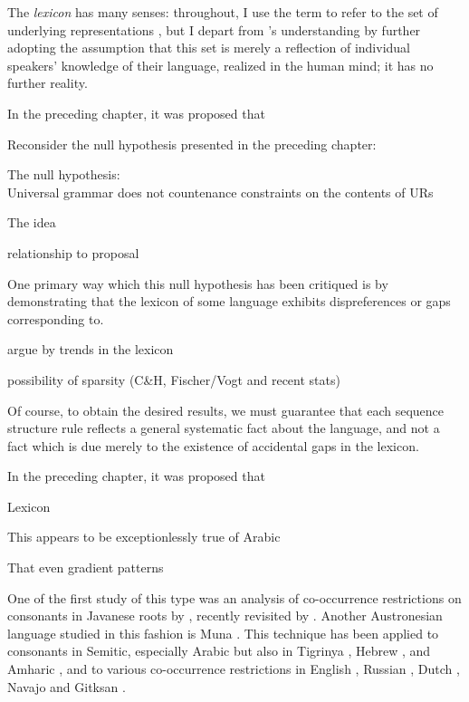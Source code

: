 
The \emph{lexicon} has many senses: throughout, I use the term to refer to the set of underlying representations \citep[][269]{LANGUAGE}, but I depart from \citeauthor{LANGUAGE}'s understanding by further adopting the assumption that this set is merely a reflection of individual speakers' knowledge of their language, realized in the human mind; it has no further reality.



In the preceding chapter, it was proposed that 

Reconsider the null hypothesis presented in the preceding chapter:

\ex The null hypothesis: \\
Universal grammar does not countenance constraints on the contents of URs
\xe

The idea 

relationship to proposal

One primary way which this null hypothesis has been critiqued is by demonstrating that the lexicon of some language 
exhibits dispreferences or gaps corresponding to.

argue by trends in the lexicon

possibility of sparsity (C\&H, Fischer/Vogt and recent stats)

Of course, to obtain the desired results, we must guarantee that each sequence structure rule reflects a general systematic fact about the language, and not a fact which is due merely to the existence of accidental gaps in the lexicon. \citep[][401, fn.~8]{Stanley1967}

In the preceding chapter, it was proposed that 

Lexicon

This appears to be exceptionlessly true of Arabic

That even gradient patterns 

One of the first study of this type was an analysis of co-occurrence restrictions on consonants in Javanese roots by \citet{Mester1988}, recently revisited by \citet{Graff2011}. 
Another Austronesian language studied in this fashion is Muna \citep{Coetzee2008a,Anttila2008}.
This technique has been applied to consonants in Semitic, especially Arabic \citep{McCarthy1988,McCarthy1994,Pierrehumbert1993,Frisch1996,Frisch2004,Coetzee2008a} but also in Tigrinya \citep{Buckley1997}, Hebrew \citep{Berent2003}, and Amharic \citep{Colavin2010}, and to various co-occurrence restrictions in English \citep{Berkley1994b,Berkley1994a,Pierrehumbert1994,Dmitrieva2008a,Dmitrieva2008b,Coetzee2008b}, Russian \citep{Padgett1992}, Dutch \citep{Graff2011}, Navajo \citep{Martin2007,Martin2011} and Gitksan \citep{Brown2010}.

